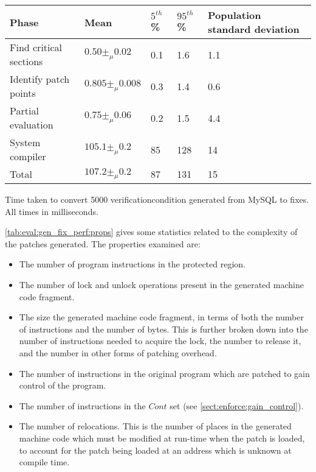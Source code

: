 \begin{sanetab}
  \begin{tabular}{|l|l|l|l|l|}
    \hline
    Phase & Mean & $5^{th}$\% & $95^{th}$\% & Population standard deviation \\
    \hline
    Find critical sections & $0.50 \pm_\mu 0.02$ & 0.1 & 1.6 & 1.1 \\
    Identify patch points & $0.805 \pm_\mu 0.008$ & 0.3 & 1.4 & 0.6 \\
    Partial evaluation & $0.75 \pm_\mu 0.06$ & 0.2 & 1.5 & 4.4 \\
    System compiler & $105.1 \pm_\mu 0.2$ & 85 & 128 & 14 \\
    \hline
    Total & $107.2 \pm_\mu 0.2$ & 87 & 131 & 15 \\
    \hline
  \end{tabular}
  \caption{Time taken to convert 5000 \gls{verificationcondition}
    generated from MySQL to fixes.  All times in milliseconds.}
  \label{tab:eval:gen_fix_perf}
\end{sanetab}

\autoref{tab:eval:gen_fix_perf:props} gives some statistics related to
the complexity of the patches generated.  The properties examined are:

\begin{itemize}
\item The number of program instructions in the protected region.
\item The number of lock and unlock operations present in the
  generated machine code fragment.
\item The size the generated machine code fragment, in terms of both
  the number of instructions and the number of bytes.  This is further
  broken down into the number of instructions needed to acquire the
  lock, the number to release it, and the number in other forms of
  patching overhead.
\item The number of instructions in the original program which are
  patched to gain control of the program.
\item The number of instructions in the $\mathit{Cont}$ set (see
  \autoref{sect:enforce:gain_control}).
\item The number of relocations.  This is the number of places in the
  generated machine code which must be modified at run-time when the
  patch is loaded, to account for the patch being loaded at an address
  which is unknown at compile time.
\end{itemize}


